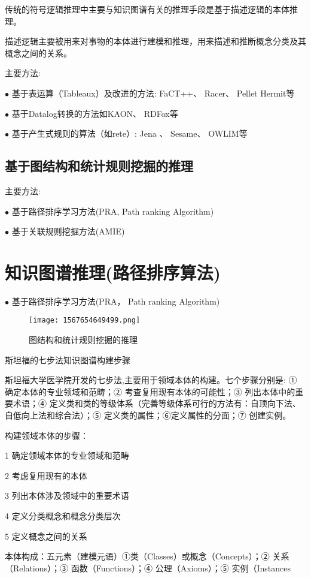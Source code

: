 传统的符号逻辑推理中主要与知识图谱有关的推理手段是基于描述逻辑的本体推理。

描述逻辑主要被⽤来对事物的本体进⾏建模和推理，⽤来描述和推断概念分类及其概念之间的关系。

主要方法:

$\bullet$ 基于表运算（Tableaux）及改进的⽅法: FaCT++、 Racer、 Pellet Hermit等

$\bullet$ 基于Datalog转换的⽅法如KAON、 RDFox等

$\bullet$ 基于产⽣式规则的算法（如rete）:  Jena 、 Sesame、 OWLIM等

\subsection{基于图结构和统计规则挖掘的推理}

主要方法:

$\bullet$ 基于路径排序学习⽅法(PRA, Path ranking Algorithm)

$\bullet$ 基于关联规则挖掘⽅法(AMIE)
\section{知识图谱推理(路径排序算法)}

$\bullet$ 基于路径排序学习⽅法(PRA， Path ranking Algorithm)
\begin{figure}[H]
\centering
\texttt{[image: 1567654649499.png]}
\caption{图结构和统计规则挖掘的推理}
\label{AI321567654649499}
\end{figure}

斯坦福的七步法知识图谱构建步骤

斯坦福大学医学院开发的七步法,主要用于领域本体的构建。七个步骤分别是: ① 确定本体的专业领域和范畴；② 考查复用现有本体的可能性；③ 列出本体中的重要术语；④ 定义类和类的等级体系（完善等级体系可行的方法有：自顶向下法、自低向上法和综合法）；⑤ 定义类的属性；⑥定义属性的分面；⑦ 创建实例。

构建领域本体的步骤：

1 确定领域本体的专业领域和范畴

2 考虑复用现有的本体

3 列出本体涉及领域中的重要术语

4 定义分类概念和概念分类层次

5 定义概念之间的关系

本体构成：五元素（建模元语）①类（Classes）或概念（Concepts）；② 关系（Relations）；③ 函数（Functions）；④ 公理（Axioms）；⑤ 实例（Instances


